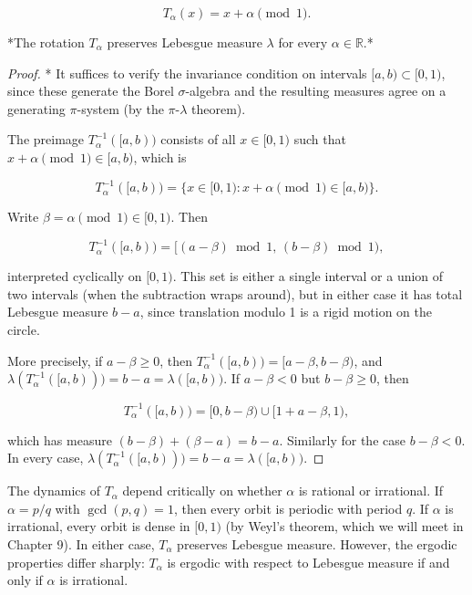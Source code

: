 \[
T_\alpha(x) = x + \alpha \pmod{1}.
\]

\begin{proposition}\label{prop:8.4.}
*The rotation $T_\alpha$ preserves Lebesgue measure $\lambda$ for every $\alpha \in \mathbb{R}$.*
\end{proposition}


\begin{proof}
* It suffices to verify the invariance condition on intervals $[a, b) \subset [0,1)$, since these generate the Borel $\sigma$-algebra and the resulting measures agree on a generating $\pi$-system (by the $\pi$-$\lambda$ theorem).

The preimage $T_\alpha^{-1}([a,b))$ consists of all $x \in [0,1)$ such that $x + \alpha \pmod{1} \in [a,b)$, which is

\[
T_\alpha^{-1}([a,b)) = \{x \in [0,1) : x + \alpha \pmod{1} \in [a,b)\}.
\]

Write $\beta = \alpha \pmod{1} \in [0,1)$. Then

\[
T_\alpha^{-1}([a,b)) = [(a - \beta) \bmod 1, \, (b - \beta) \bmod 1),
\]

interpreted cyclically on $[0,1)$. This set is either a single interval or a union of two intervals (when the subtraction wraps around), but in either case it has total Lebesgue measure $b - a$, since translation modulo 1 is a rigid motion on the circle.

More precisely, if $a - \beta \ge 0$, then $T_\alpha^{-1}([a,b)) = [a - \beta, b - \beta)$, and $\lambda(T_\alpha^{-1}([a,b))) = b - a = \lambda([a,b))$. If $a - \beta < 0$ but $b - \beta \ge 0$, then

\[
T_\alpha^{-1}([a,b)) = [0, b - \beta) \cup [1 + a - \beta, 1),
\]

which has measure $(b - \beta) + (\beta - a) = b - a$. Similarly for the case $b - \beta < 0$. In every case, $\lambda(T_\alpha^{-1}([a,b))) = b - a = \lambda([a,b))$.
\end{proof}


\begin{remark}
The dynamics of $T_\alpha$ depend critically on whether $\alpha$ is rational or irrational. If $\alpha = p/q$ with $\gcd(p,q) = 1$, then every orbit is periodic with period $q$. If $\alpha$ is irrational, every orbit is dense in $[0,1)$ (by Weyl's theorem, which we will meet in Chapter 9). In either case, $T_\alpha$ preserves Lebesgue measure. However, the ergodic properties differ sharply: $T_\alpha$ is ergodic with respect to Lebesgue measure if and only if $\alpha$ is irrational.
\end{remark}


